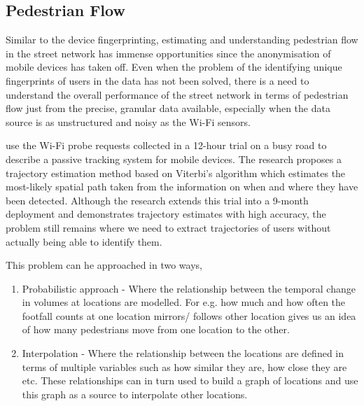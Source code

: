 \subsection{Pedestrian Flow}

Similar to the device fingerprinting, estimating and understanding pedestrian flow in the street network has immense opportunities since the anonymisation of mobile devices has taken off.
Even when the problem of the identifying unique fingerprints of users in the data has not been solved, there is a need to understand the overall performance of the street network in terms of pedestrian flow just from the precise, granular data available, especially when the data source is as unstructured and noisy as the Wi-Fi sensors.

\citep{musa2011} use the Wi-Fi probe requests collected in a 12-hour trial on a busy road to describe a passive tracking system for mobile devices.
The research proposes a trajectory estimation method based on Viterbi's algorithm which estimates the most-likely spatial path taken from the information on when and where they have been detected. 
Although the research extends this trial into a 9-month deployment and demonstrates trajectory estimates with high accuracy, the problem still remains where we need to extract trajectories of users without actually being able to identify them.

This problem can he approached in two ways,


\begin{enumerate}
  \itemsep-0.25em
  \item Probabilistic approach - Where the relationship between the temporal change in volumes at locations are modelled.
  For e.g. how much and how often the footfall counts at one location mirrors/ follows other location gives us an idea of how many pedestrians move from one location to the other.
  \item Interpolation - Where the relationship between the locations are defined in terms of multiple variables such as how similar they are, how close they are etc.
  These relationships can in turn used to build a graph of locations and use this graph as a source to interpolate other locations.
\end{enumerate}

